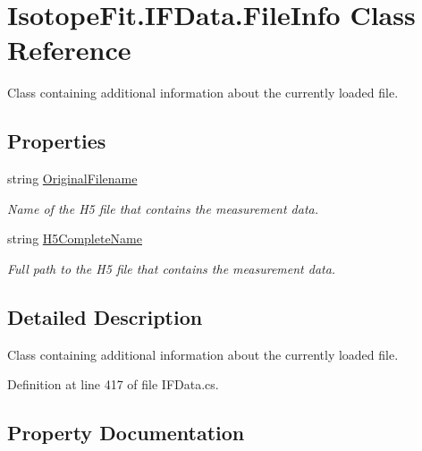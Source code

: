 \hypertarget{class_isotope_fit_1_1_i_f_data_1_1_file_info}{}\section{Isotope\+Fit.\+I\+F\+Data.\+File\+Info Class Reference}
\label{class_isotope_fit_1_1_i_f_data_1_1_file_info}


Class containing additional information about the currently loaded file.  


\subsection*{Properties}
\begin{DoxyCompactItemize}
\item 
string \mbox{\hyperlink{class_isotope_fit_1_1_i_f_data_1_1_file_info_a465af980a8c2f2a971d213e328b5932c}{Original\+Filename}}
\begin{DoxyCompactList}\small\item\em Name of the H5 file that contains the measurement data. \end{DoxyCompactList}\item 
string \mbox{\hyperlink{class_isotope_fit_1_1_i_f_data_1_1_file_info_a3c352cd3b905abe1210e97cc24be0b88}{H5\+Complete\+Name}}
\begin{DoxyCompactList}\small\item\em Full path to the H5 file that contains the measurement data. \end{DoxyCompactList}\end{DoxyCompactItemize}


\subsection{Detailed Description}
Class containing additional information about the currently loaded file. 



Definition at line 417 of file I\+F\+Data.\+cs.



\subsection{Property Documentation}
\mbox{\label{class_isotope_fit_1_1_i_f_data_1_1_file_info_a3c352cd3b905abe1210e97cc24be0b88}} 
